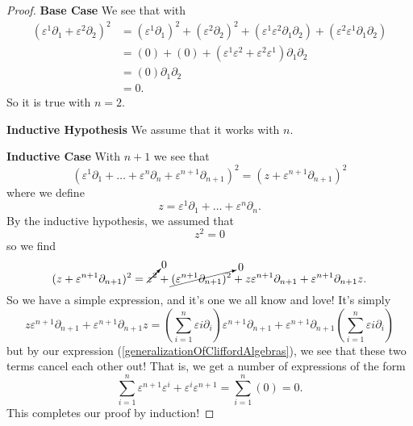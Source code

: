 \begin{proof}
\noindent\textbf{Base Case} We see that with
\begin{subequations}
\begin{align}
\left(\varepsilon^1\partial_1 + \varepsilon^2\partial_2 \right)^2 &= (\varepsilon^1\partial_1)^2 + (\varepsilon^2\partial_2)^2 + (\varepsilon^1\varepsilon^2\partial_1\partial_2) + (\varepsilon^2\varepsilon^1\partial_1\partial_2)\\
&= (0) + (0) + (\varepsilon^1\varepsilon^2+\varepsilon^2\varepsilon^1)\partial_1\partial_2 \\
&= (0)\partial_1\partial_2\\
&= 0.
\end{align}
\end{subequations}
So it is true with $n=2$.

\noindent\textbf{Inductive Hypothesis} We assume that it works with $n$.

\noindent\textbf{Inductive Case} With $n+1$ we see that
\begin{equation}
\left(\varepsilon^1\partial_1 +\ldots+\varepsilon^n\partial_n+ \varepsilon^{n+1}\partial_{n+1} \right)^2 = (z + \varepsilon^{n+1}\partial_{n+1})^2
\end{equation}
where we define
\begin{equation}
z = \varepsilon^1\partial_1 +\ldots+\varepsilon^n\partial_n.
\end{equation}
By the inductive hypothesis, we assumed that
\begin{equation}
z^2 = 0
\end{equation}
so we find
\begin{equation}
(z + \varepsilon^{n+1}\partial_{n+1})^2 = \cancelto{0}{z^2} + \cancelto{0}{(\varepsilon^{n+1}\partial_{n+1})^2} + z\varepsilon^{n+1}\partial_{n+1} + \varepsilon^{n+1}\partial_{n+1}z.
\end{equation}
So we have a simple expression, and it's one we all know and love! It's simply
\begin{equation}
z\varepsilon^{n+1}\partial_{n+1} + \varepsilon^{n+1}\partial_{n+1}z = \left(\sum_{i=1}^{n}\varepsilon{i}\partial_{i}\right)\varepsilon^{n+1}\partial_{n+1} + \varepsilon^{n+1}\partial_{n+1}\left(\sum_{i=1}^{n}\varepsilon{i}\partial_{i}\right)
\end{equation}
but by our expression (\ref{generalizationOfCliffordAlgebras}), we see that
these two terms cancel each other out! That is, we get a number of expressions
of the form
\begin{equation}
\sum_{i=1}^{n}\varepsilon^{n+1}\varepsilon^{i} + \varepsilon^{i}\varepsilon^{n+1} = \sum_{i=1}^{n}(0) = 0.
\end{equation}
This completes our proof by induction!
\end{proof}
